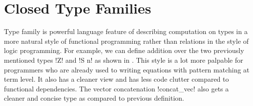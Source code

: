 \documentclass[format=acmsmall,manuscript,review,screen,nonacm,margin=1in,11pt]{acmart}
\begin{document}

\section{Closed Type Families}\label{sec:tf-closed}
Type family is powerful language feature of describing computation on types in a more
natural style of functional programming rather than relations in the style of logic programming.
For example, we can define addition over the two previously mentioned types !Z! and !S n!
as shown in . This style is a lot more palpable for programmers
who are already used to writing equations with pattern matching at term level.
It also has a cleaner view and has less code clutter compared to functional dependencies.
The vector concatenation !concat_vec! also gets a cleaner and concise type as compared to previous definition.
\end{document}
